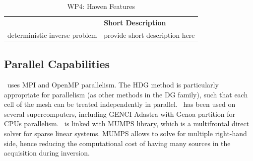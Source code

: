 \begin{table}[h!]
    \centering
    { 
        \setlength{\parindent}{0pt}
        \def\arraystretch{1.25}
        {
            \fontsize{9}{11}\selectfont
            \begin{tabular}{!{\color{numpexgray}\vrule}p{.25\linewidth}!{\color{numpexgray}\vrule}p{.6885\linewidth}!{\color{numpexgray}\vrule}}
    
     &  {\rule{0pt}{2.5ex}\color{white}\bf Short Description }\\ 
    
    deterministic inverse problem & provide short description here \\
\end{tabular}
        }
    }
    \caption{WP4: Hawen Features}
    \label{tab:WP4:Hawen:features}
\end{table}


\subsection{Parallel Capabilities}
\label{sec:WP4:Hawen:performances}


\hawen~uses MPI and OpenMP parallelism. The HDG method is particularly 
appropriate for parallelism (as other methods in the DG family), such 
that each cell of the mesh can be treated independently in parallel. 
\hawen~has been used on several supercomputers, including GENCI Adastra
with Genoa partition for CPUs parallelism.
\hawen~is linked with MUMPS library, which is a multifrontal direct solver 
for sparse linear systems. 
MUMPS allows to solve for multiple right-hand side, hence reducing the 
computational cost of having many sources in the acquisition during 
inversion.



